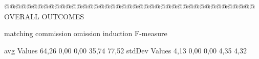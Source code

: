 @@@@@@@@@@@@@@@@@@@@@@@@@@@@@@@@@@@@@@@@@@@@@ OVERALL OUTCOMES

               matching commission   omission  induction  F-measure
               
avg Values      64,26       0,00       0,00      35,74     77,52        
stdDev Values    4,13       0,00       0,00       4,35      4,32        